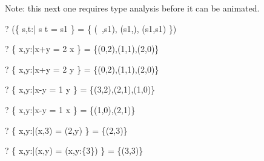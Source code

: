 \documentclass{article}
\begin{document}
Note: this next one requires type analysis before it can be animated.
\begin{zed}
  \vdash? (\{ s,t:\power \nat | s \cup t = s1 \} 
       = \{ (\emptyset~,s1), (s1,\emptyset), (s1,s1) \})
\end{zed}

\begin{zed}
  \vdash? \{ x,y:\nat|x+y = 2 \land x  \} = \{(0,2),(1,1),(2,0)\}
\end{zed}
\begin{zed}
  \vdash? \{ x,y:\nat|x+y = 2 \land y  \} = \{(0,2),(1,1),(2,0)\}
\end{zed}
\begin{zed}
  \vdash? \{ x,y:\nat|x-y = 1  \geq y \} = \{(3,2),(2,1),(1,0)\}
\end{zed}
\begin{zed}
  \vdash? \{ x,y:\nat|x-y = 1  \geq x \} = \{(1,0),(2,1)\}
\end{zed}
\begin{zed}
  \vdash? \{ x,y:\nat|(x,3) = (2,y) \} = \{(2,3)\}
\end{zed}
\begin{zed}
  \vdash? \{ x,y:\nat|(x,y) = (\mu x,y:\{3\}) \} = \{(3,3)\}
\end{zed}
\end{document}
